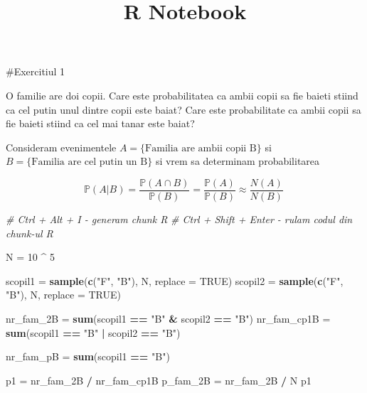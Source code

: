 \documentclass[
]{article}
\title{R Notebook}
\author{}
\date{\vspace{-2.5em}}
\newenvironment{Shaded}{\begin{snugshade}}{\end{snugshade}}
\newcommand{\CommentTok}[1]{\textcolor[rgb]{0.56,0.35,0.01}{\textit{#1}}}
\newcommand{\DataTypeTok}[1]{\textcolor[rgb]{0.13,0.29,0.53}{#1}}
\newcommand{\DecValTok}[1]{\textcolor[rgb]{0.00,0.00,0.81}{#1}}
\newcommand{\KeywordTok}[1]{\textcolor[rgb]{0.13,0.29,0.53}{\textbf{#1}}}
\newcommand{\NormalTok}[1]{#1}
\newcommand{\OperatorTok}[1]{\textcolor[rgb]{0.81,0.36,0.00}{\textbf{#1}}}
\newcommand{\OtherTok}[1]{\textcolor[rgb]{0.56,0.35,0.01}{#1}}
\newcommand{\StringTok}[1]{\textcolor[rgb]{0.31,0.60,0.02}{#1}}
\begin{document}
\maketitle

\#Exercitiul 1

O familie are doi copii. Care este probabilitatea ca ambii copii sa fie
baieti stiind ca cel putin unul dintre copii este baiat? Care este
probabilitate ca ambii copii sa fie baieti stiind ca cel mai tanar este
baiat?

Consideram evenimentele \(A = \{\text{Familia are ambii copii B}\}\) si
\(B = \{\text{Familia are cel putin un B}\}\) si vrem sa determinam
probabilitarea

\[
\mathbb{P}(A|B) = \frac{\mathbb{P}(A\cap B)}{\mathbb{P}(B)} = \frac{\mathbb{P}(A)}{\mathbb{P}(B)}\approx \frac{N(A)}{N(B)}\
\]

\begin{Shaded}
\begin{Highlighting}[]
\CommentTok{# Ctrl + Alt + I - generam chunk R}
\CommentTok{# Ctrl + Shift + Enter - rulam codul din chunk-ul R}

\NormalTok{N =}\StringTok{ }\DecValTok{10} \OperatorTok{^}\StringTok{ }\DecValTok{5}

\NormalTok{scopil1 =}\StringTok{ }\KeywordTok{sample}\NormalTok{(}\KeywordTok{c}\NormalTok{(}\StringTok{"F"}\NormalTok{, }\StringTok{"B"}\NormalTok{), N, }\DataTypeTok{replace =} \OtherTok{TRUE}\NormalTok{)}
\NormalTok{scopil2 =}\StringTok{ }\KeywordTok{sample}\NormalTok{(}\KeywordTok{c}\NormalTok{(}\StringTok{"F"}\NormalTok{, }\StringTok{"B"}\NormalTok{), N, }\DataTypeTok{replace =} \OtherTok{TRUE}\NormalTok{)}

\NormalTok{nr_fam_2B =}\StringTok{ }\KeywordTok{sum}\NormalTok{(scopil1 }\OperatorTok{==}\StringTok{ "B"} \OperatorTok{&}\StringTok{ }\NormalTok{scopil2 }\OperatorTok{==}\StringTok{ "B"}\NormalTok{)}
\NormalTok{nr_fam_cp1B =}\StringTok{ }\KeywordTok{sum}\NormalTok{(scopil1 }\OperatorTok{==}\StringTok{ "B"} \OperatorTok{|}\StringTok{ }\NormalTok{scopil2 }\OperatorTok{==}\StringTok{ "B"}\NormalTok{)}

\NormalTok{nr_fam_pB =}\StringTok{ }\KeywordTok{sum}\NormalTok{(scopil1 }\OperatorTok{==}\StringTok{ "B"}\NormalTok{)}


\NormalTok{p1 =}\StringTok{ }\NormalTok{nr_fam_2B }\OperatorTok{/}\StringTok{ }\NormalTok{nr_fam_cp1B}
\NormalTok{p_fam_2B =}\StringTok{ }\NormalTok{nr_fam_2B }\OperatorTok{/}\StringTok{ }\NormalTok{N}
\NormalTok{p1}
\end{Highlighting}
\end{Shaded}
\end{document}
